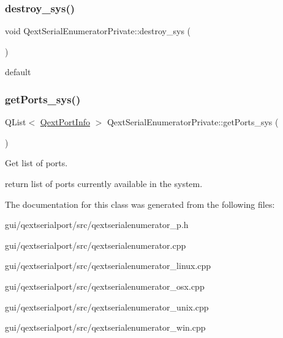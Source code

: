 \subsubsection{\texorpdfstring{destroy\+\_\+sys()}{destroy\_sys()}}
{\footnotesize\ttfamily void Qext\+Serial\+Enumerator\+Private\+::destroy\+\_\+sys (\begin{DoxyParamCaption}{ }\end{DoxyParamCaption})}

default \mbox{\label{classQextSerialEnumeratorPrivate_a5293c28583f85d2efeef7e4f3bc4aeba}} 
\subsubsection{\texorpdfstring{get\+Ports\+\_\+sys()}{getPorts\_sys()}}
{\footnotesize\ttfamily Q\+List$<$ \hyperlink{structQextPortInfo}{Qext\+Port\+Info} $>$ Qext\+Serial\+Enumerator\+Private\+::get\+Ports\+\_\+sys (\begin{DoxyParamCaption}{ }\end{DoxyParamCaption})\hspace{0.3cm}{\ttfamily [static]}}

Get list of ports.

return list of ports currently available in the system. 

The documentation for this class was generated from the following files\+:\begin{DoxyCompactItemize}
\item 
gui/qextserialport/src/qextserialenumerator\+\_\+p.\+h\item 
gui/qextserialport/src/qextserialenumerator.\+cpp\item 
gui/qextserialport/src/qextserialenumerator\+\_\+linux.\+cpp\item 
gui/qextserialport/src/qextserialenumerator\+\_\+osx.\+cpp\item 
gui/qextserialport/src/qextserialenumerator\+\_\+unix.\+cpp\item 
gui/qextserialport/src/qextserialenumerator\+\_\+win.\+cpp\end{DoxyCompactItemize}

